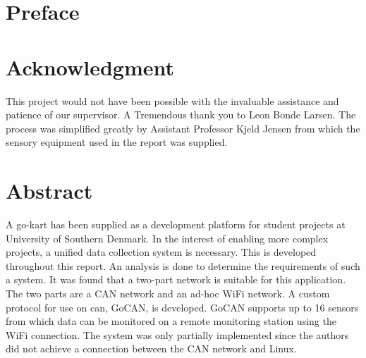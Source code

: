 \section*{Preface}

\section*{Acknowledgment}
This project would not have been possible with the invaluable assistance and patience of our supervisor. 
A Tremendous thank you to Leon Bonde Larsen.
The process was simplified greatly by Assistant Professor Kjeld Jensen from which the sensory equipment used in the report was supplied.

\section*{Abstract}
A go-kart has been supplied as a development platform for student projects at University of Southern Denmark.
In the interest of enabling more complex projects, a unified data collection system is necessary.
This is developed throughout this report. 
An analysis is done to determine the requirements of such a system.
It was found that a two-part network is suitable for this application.
The two parts are a CAN network and an ad-hoc WiFi network.
A custom protocol for use on can, GoCAN, is developed.
GoCAN supports up to 16 sensors from which data can be monitored on a remote monitoring station using the WiFi connection.
The system was only partially implemented since the authors did not achieve a connection between the CAN network and Linux.
